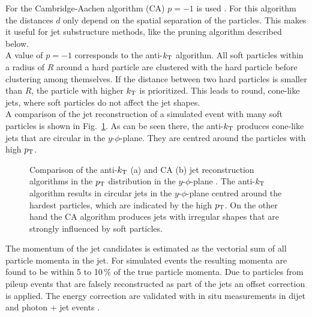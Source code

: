 \noindent For the Cambridge-Aachen algorithm (CA) $p=-1$ is used \cite{CAalgo}. For this algorithm the distances $d$ only depend on the spatial separation of the particles. This makes it useful for jet substructure methods, like the pruning algorithm described below.\\

\noindent A value of $p=-1$ corresponds to the anti-$k_{\rm T}$ algorithm. All soft particles within a radius of $R$ around a hard particle are clustered with the hard particle before clustering among themselves. If the distance between two hard particles is smaller than $R$, the particle with higher $k_{\rm T}$ is prioritized. This leads to round, cone-like jets, where soft particles do not affect the jet shapes.\\

\noindent A comparison of the jet reconstruction of a simulated event with many soft particles is shown in Fig.~\ref{fig:eventreco:jet_reco}. As can be seen there, the anti-$k_{\rm T}$ produces cone-like jets that are circular in the $y$-$\phi$-plane. They are centred around the particles with high $p_{\rm T}$.\\
\begin{figure}
	\centering
	\caption[Comparison of the anti-$k_{\rm T}$ and CA jet reconstruction algorithms]{Comparison of the anti-$k_{\rm T}$ (a) and CA (b) jet reconstruction algorithms in the $p_{\rm T}$ distribution in the $y$-$\phi$-plane \cite{antikt}. The anti-$k_{\rm T}$ algorithm results in circular jets in the $y$-$\phi$-plane centred around the hardest particles, which are indicated by the high $p_{\rm T}$. On the other hand the CA algorithm produces jets with irregular shapes that are strongly influenced by soft particles.}
	\label{fig:eventreco:jet_reco}
\end{figure}

\noindent The momentum of the jet candidates is estimated as the vectorial sum of all particle momenta in the jet. For simulated events the resulting momenta are found to be within 5 to 10\,\% of the true particle momenta. Due to particles from pileup events that are falsely reconstructed as part of the jets an offset correction is applied. The energy correction are validated with in situ measurements in dijet and photon + jet events \cite{jetcorrection}.\\

